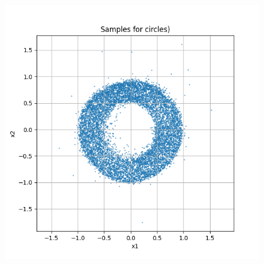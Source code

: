 \documentclass[a4paper,12pt]{article}
\begin{document}
\begin{figure}[H]
\begin{minipage}{0.3\textwidth}
  \end{minipage}
  \begin{minipage}{0.3\textwidth}
      \centering
      \includegraphics[width=\linewidth]{"images/Samples for ddpm_2_50_0.0001_0.02_circles.png"}
  \end{minipage}

  \vspace{0.5cm}


\end{figure}
\end{document}
